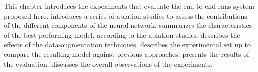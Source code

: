 
This chapter introduces the experiments that evaluate the
end-to-end \glspl{rna} system proposed here.
 introduces a series of ablation
studies to assess the contributions of the different
components of the neural network.
 summarizes the
characteristics of the best performing model, according to
the ablation studies. 
describes the effects of the data-augmentation techniques.
 describes the
experimental set up to compare the resulting model 
against previous approaches.  presents the
results of the evaluation.  discusses the
overall observations of the experiments. 
